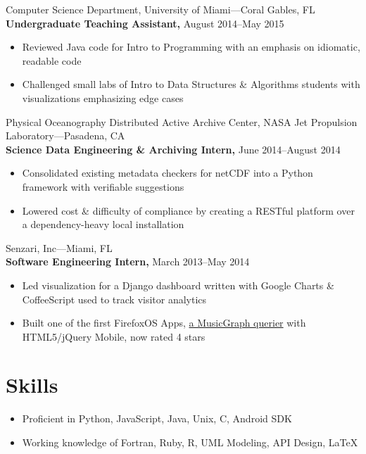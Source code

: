 \documentclass[letterpaper,12pt]{article}
\begin{document}
\vskip 1.5mm

Computer Science Department, University of Miami---Coral Gables, FL\\
\textbf{Undergraduate Teaching Assistant,} August 2014--May 2015
\begin{itemize}
  \item Reviewed Java code for Intro to Programming with an emphasis on idiomatic, readable code
  \item Challenged small labs of Intro to Data Structures \& Algorithms students with visualizations emphasizing edge cases
\end{itemize}

\vskip 1.5mm

Physical Oceanography Distributed Active Archive Center, NASA Jet Propulsion Laboratory---Pasadena, CA\\
\textbf{Science Data Engineering \& Archiving Intern,} June 2014--August 2014
\begin{itemize}
  \item Consolidated existing metadata checkers for netCDF into a Python framework with verifiable suggestions
  \item Lowered cost \& difficulty of compliance by creating a RESTful platform over a dependency-heavy local installation
\end{itemize}

\vskip 1.5mm

Senzari, Inc---Miami, FL\\
\textbf{Software Engineering Intern,} March 2013--May 2014
\begin{itemize}
  \item Led visualization for a Django dashboard written with Google Charts \& CoffeeScript used to track visitor analytics
  \item Built one of the first FirefoxOS Apps, \href{https://marketplace.firefox.com/app/music-graph-1}{a MusicGraph querier} with HTML5/jQuery Mobile, now rated 4 stars
\end{itemize}

\vskip 3mm

\section*{Skills}
\begin{itemize}
  \item Proficient in Python, JavaScript, Java, Unix, C, Android SDK
  \item Working knowledge of Fortran, Ruby, R, UML Modeling, API Design, \LaTeX
\end{itemize}
\end{document}
